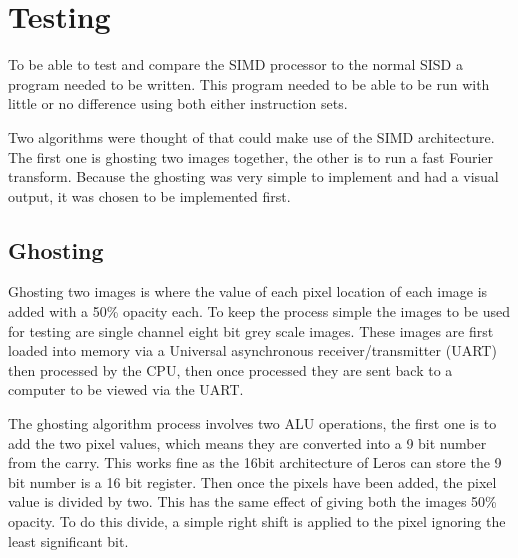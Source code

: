 \section{Testing}

To be able to test and compare the SIMD processor to the normal SISD a program
needed to be written. This program needed to be able to be run with little or no
difference using both either instruction sets.

Two algorithms were thought of that could make use of the SIMD architecture.
The first one is ghosting two images together, the other is to run a fast
Fourier transform. Because the ghosting was very simple to implement and had a
visual output, it was chosen to be implemented first.

\subsection{Ghosting}
  Ghosting two images is where the value of each pixel location of each image is
  added with a 50\% opacity each. To keep the process simple the images to be
  used for testing are single channel eight bit grey scale images. These images
  are first loaded into memory via a Universal asynchronous receiver/transmitter
  (UART) then processed by the CPU, then once processed they are sent back to a
  computer to be viewed via the UART.
  

  The ghosting algorithm process involves two ALU operations, the first one is
  to add the two pixel values, which means they are converted into a 9 bit
  number from the carry. This works fine as the 16bit architecture of Leros can
  store the 9 bit number is a 16 bit register. Then once the pixels have been
  added, the pixel value is divided by two. This has the same effect of giving
  both the images 50\% opacity. To do this divide, a simple right shift is
  applied to the pixel ignoring the least significant bit.

